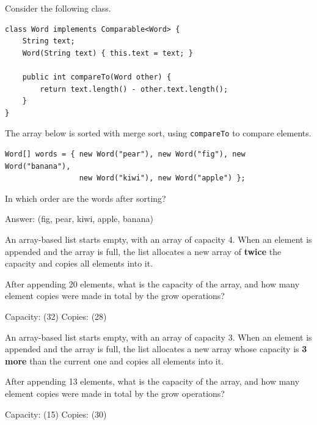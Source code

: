 \begin{question}
Consider the following class.

\begin{lstlisting}
class Word implements Comparable<Word> {
    String text;
    Word(String text) { this.text = text; }

    public int compareTo(Word other) {
        return text.length() - other.text.length();
    }
}
\end{lstlisting}

The array below is sorted with merge sort, using \lstinline|compareTo| to compare elements.

\begin{lstlisting}
Word[] words = { new Word("pear"), new Word("fig"), new Word("banana"),
                 new Word("kiwi"), new Word("apple") };
\end{lstlisting}

In which order are the words after sorting?

Answer: \underline{\hspace{2.5in}} \ifanswers (fig, pear, kiwi, apple, banana)\fi
\end{question}


\begin{question}
An array-based list starts empty, with an array of capacity 4. When an element is appended and the array is full, the list allocates a new array of \textbf{twice} the capacity and copies all elements into it.

After appending 20 elements, what is the capacity of the array, and how many element copies were made in total by the grow operations?

Capacity: \underline{\hspace{1in}} \ifanswers (32)\fi \qquad
Copies: \underline{\hspace{1in}} \ifanswers (28)\fi
\end{question}

\begin{question}
An array-based list starts empty, with an array of capacity 3. When an element is appended and the array is full, the list allocates a new array whose capacity is \textbf{3 more} than the current one and copies all elements into it.

After appending 13 elements, what is the capacity of the array, and how many element copies were made in total by the grow operations?

Capacity: \underline{\hspace{1in}} \ifanswers (15)\fi \qquad
Copies: \underline{\hspace{1in}} \ifanswers (30)\fi
\end{question}

